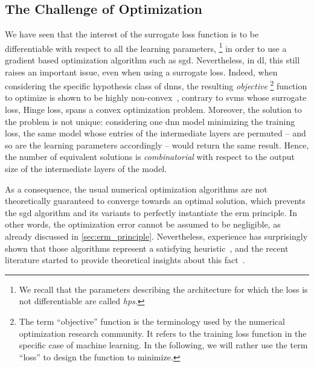 \subsection{The Challenge of Optimization}
\label{sec:challenge_optimization}
We have seen that the interest of the surrogate loss function is to be differentiable with respect to all the learning parameters,%
\footnote{
	We recall that the parameters describing the architecture for which the loss is not differentiable are called \emph{\glspl{hp}}.
} 
in order to use a gradient based optimization algorithm such as \gls{sgd}.
Nevertheless, in \gls{dl}, this still raises an important issue, even when using a surrogate loss. 
Indeed, when considering the specific hypothesis class of \glspl{dnn}, the resulting \emph{objective}%
\footnote{
	The term ``objective'' function is the terminology used by the numerical optimization research community.
	It refers to the training loss function in the specific case of machine learning.
	In the following, we will rather use the term ``loss'' to design the function to minimize.
} 
function to optimize is shown to be highly non-convex~\cite{choromanska_loss_2015}, contrary to \glspl{svm} whose surrogate loss, \ie{} Hinge loss, spans a convex optimization problem.
Moreover, the solution to the problem is not unique: considering one \gls{dnn} model minimizing the training loss, the same model whose entries of the intermediate layers are permuted -- and so are the learning parameters accordingly -- would return the same result.
Hence, the number of equivalent solutions is \emph{combinatorial} with respect to the output size of the intermediate layers of the model.

As a consequence, the usual numerical optimization algorithms are not theoretically guaranteed to converge towards an optimal solution, which prevents the \gls{sgd} algorithm and its variants to perfectly instantiate the \gls{erm} principle.
In other words, the optimization error cannot be assumed to be negligible, as already discussed in \autoref{sec:erm_principle}.
Nevertheless, experience has surprisingly shown that those algorithms represent a satisfying heuristic~\cite{lecun_efficient_2012}, and the recent literature started to provide theoretical insights about this fact~\cite{du_gradient_2019,du_gradient2_2019}.

